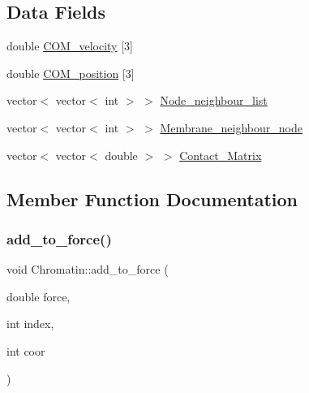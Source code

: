 \subsection*{Data Fields}
\begin{DoxyCompactItemize}
\item 
double \mbox{\hyperlink{classChromatin_ae2f34981e33be9eb23851d9515f42b9f}{C\+O\+M\+\_\+velocity}} \mbox{[}3\mbox{]}
\item 
double \mbox{\hyperlink{classChromatin_a017fac70664bad43142caf019eb681fe}{C\+O\+M\+\_\+position}} \mbox{[}3\mbox{]}
\item 
vector$<$ vector$<$ int $>$ $>$ \mbox{\hyperlink{classChromatin_a881c463296819b2dc82e04817ae65491}{Node\+\_\+neighbour\+\_\+list}}
\item 
vector$<$ vector$<$ int $>$ $>$ \mbox{\hyperlink{classChromatin_a8530902fd510e707484abd584b1f2992}{Membrane\+\_\+neighbour\+\_\+node}}
\item 
vector$<$ vector$<$ double $>$ $>$ \mbox{\hyperlink{classChromatin_a163b690f6c7f65a466816e5356cd9038}{Contact\+\_\+\+Matrix}}
\end{DoxyCompactItemize}


\subsection{Member Function Documentation}
\mbox{\label{classChromatin_a5bc9c714d620b6cd1f3b3a6d85dbd1d8}} 
\subsubsection{\texorpdfstring{add\_to\_force()}{add\_to\_force()}}
{\footnotesize\ttfamily void Chromatin\+::add\+\_\+to\+\_\+force (\begin{DoxyParamCaption}\item[{double}]{force,  }\item[{int}]{index,  }\item[{int}]{coor }\end{DoxyParamCaption})\hspace{0.3cm}{\ttfamily [inline]}}

\mbox{\label{classChromatin_ae3f17fd0b51db84a3890105f8f4a7028}} 
